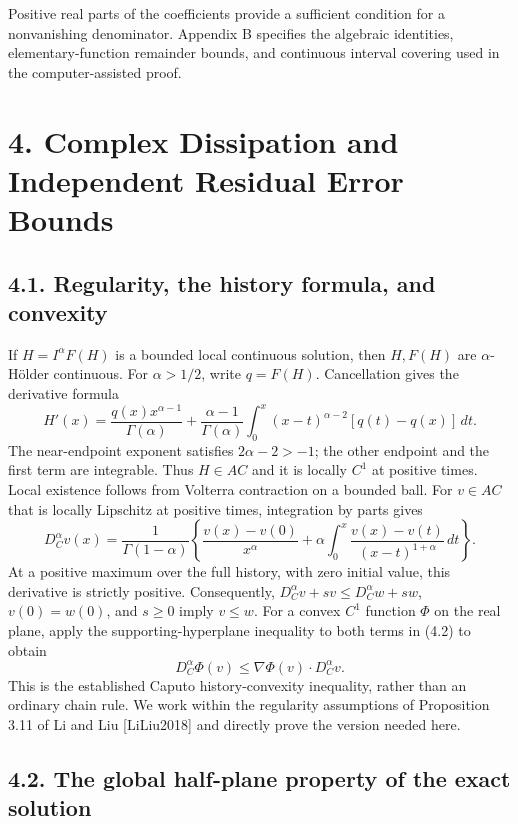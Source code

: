 \documentclass[a4paper,11pt]{article}
\begin{document}
Positive real parts of the coefficients provide a sufficient condition for a nonvanishing denominator. Appendix B specifies the algebraic identities, elementary-function remainder bounds, and continuous interval covering used in the computer-assisted proof.

\section*{4. Complex Dissipation and Independent Residual Error Bounds}

\subsection*{4.1. Regularity, the history formula, and convexity}

If \(H=I^\alpha F(H)\) is a bounded local continuous solution, then \(H,F(H)\) are \(\alpha\)-Hölder continuous. For \(\alpha>1/2\), write \(q=F(H)\). Cancellation gives the derivative formula
\[
H'(x)=\frac{q(x)x^{\alpha-1}}{\Gamma(\alpha)}
 +\frac{\alpha-1}{\Gamma(\alpha)}
\int_0^x(x-t)^{\alpha-2}[q(t)-q(x)]\,dt.
\tag{4.1}
\]
The near-endpoint exponent satisfies \(2\alpha-2>-1\); the other endpoint and the first term are integrable. Thus \(H\in AC\) and it is locally \(C^1\) at positive times. Local existence follows from Volterra contraction on a bounded ball. For \(v\in AC\) that is locally Lipschitz at positive times, integration by parts gives
\[
D_C^\alpha v(x)=\frac1{\Gamma(1-\alpha)}
\left\{\frac{v(x)-v(0)}{x^\alpha}
 +\alpha\int_0^x\frac{v(x)-v(t)}{(x-t)^{1+\alpha}}\,dt\right\}.
\tag{4.2}
\]
At a positive maximum over the full history, with zero initial value, this derivative is strictly positive. Consequently, \(D_C^\alpha v+s v\le D_C^\alpha w+s w\), \(v(0)=w(0)\), and \(s\ge0\) imply \(v\le w\). For a convex \(C^1\) function \(\Phi\) on the real plane, apply the supporting-hyperplane inequality to both terms in (4.2) to obtain
\[
D_C^\alpha\Phi(v)\le\nabla\Phi(v)\cdot D_C^\alpha v.
\tag{4.3}
\]
This is the established Caputo history-convexity inequality, rather than an ordinary chain rule. We work within the regularity assumptions of Proposition 3.11 of Li and Liu [LiLiu2018] and directly prove the version needed here.

\subsection*{4.2. The global half-plane property of the exact solution}
\end{document}
